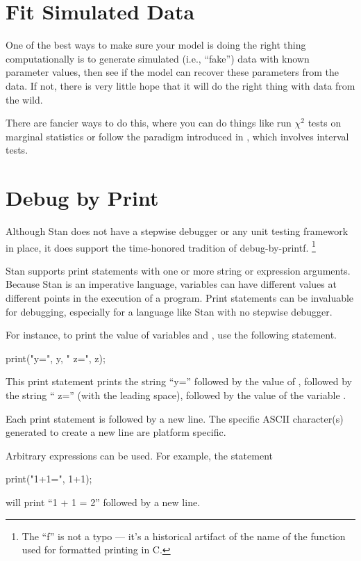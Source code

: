 \section{Fit Simulated Data}

One of the best ways to make sure your model is doing the right thing
computationally is to generate simulated (i.e., ``fake'') data with
known parameter values, then see if the model can recover these
parameters from the data.  If not, there is very little hope that it
will do the right thing with data from the wild.

There are fancier ways to do this, where you can do things like run
$\chi^2$ tests on marginal statistics or follow the paradigm
introduced in \citep{CookGelmanRubin:2006}, which involves interval
tests.

\section{Debug by Print}

Although Stan does not have a stepwise debugger or any unit testing
framework in place, it does support the time-honored tradition of
debug-by-printf.%
%
\footnote{The ``f'' is not a typo --- it's a historical artifact of
  the name of the  function used for formatted printing
  in C.}

Stan supports print statements with one or more string or expression
arguments.  Because Stan is an imperative language, variables can have
different values at different points in the execution of a program.
Print statements can be invaluable for debugging, especially for a
language like Stan with no stepwise debugger.

For instance, to print the value of variables  and
, use the following statement.
%
\begin{stancode}
print("y=", y, " z=", z);
\end{stancode}
%
This print statement prints the string ``y='' followed by the value of
, followed by the string `` z=''
(with the leading space), followed by the value of the variable
.

Each print statement is followed by a new line.  The specific ASCII
character(s) generated to create a new line are platform specific.

Arbitrary expressions can be used.  For example, the statement
\begin{stancode}
print("1+1=", 1+1);
\end{stancode}
%
will print ``1 + 1 = 2'' followed by a new line.

